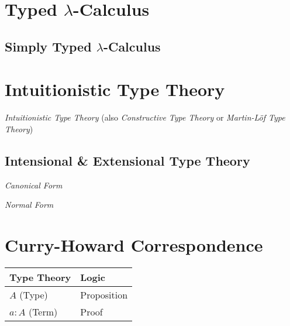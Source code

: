 \documentclass{article}
\begin{document}
\section{Typed $\lambda$-Calculus}\label{sec:typed_lambda_calculus}

\subsection{Simply Typed $\lambda$-Calculus}\label{subsec:simply_typed}


\section{Intuitionistic Type Theory}

\emph{Intuitionistic Type Theory} (also \emph{Constructive Type Theory} or
\emph{Martin-L\"of Type Theory})

\subsection{Intensional \& Extensional Type Theory}
\label{subsec:intension_extension}

\emph{Canonical Form}

\emph{Normal Form}



\section{Curry-Howard Correspondence}\label{sec:curry_howard}

\begin{tabular}{| l | l |}
\hline
\textbf{Type Theory} & \textbf{Logic} \\ \hline \hline
$A$ (Type) & Proposition \\ \hline
$a : A$ (Term) & Proof \\
\hline
\end{tabular}
\end{document}
